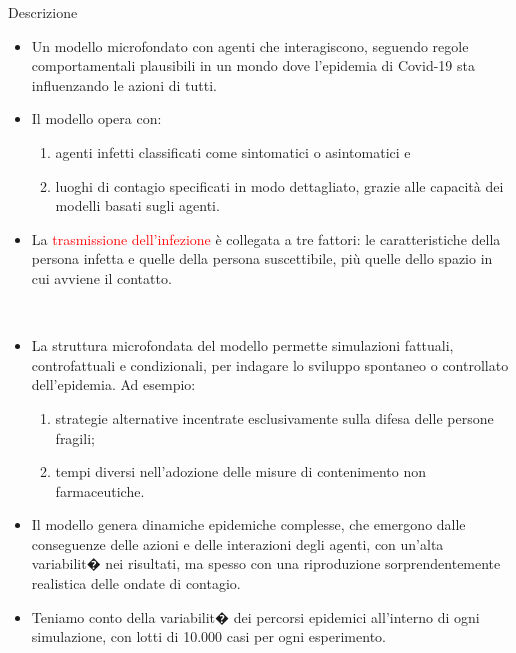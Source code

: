 \documentclass[]{beamer}
\begin{document}
\begin{frame}{Descrizione}

\begin{itemize}

\item
Un modello microfondato con agenti che interagiscono, seguendo regole comportamentali plausibili in un mondo dove l'epidemia di Covid-19 sta influenzando le azioni di tutti.
\item
Il modello opera con:

\begin{enumerate}[i]
\item agenti infetti classificati come sintomatici o asintomatici e
\item luoghi di contagio specificati in modo dettagliato, grazie alle capacit\`{a} dei modelli basati sugli agenti.
\end{enumerate}

 \item La \textcolor{red}{trasmissione dell'infezione} \`{e} collegata a tre fattori: le caratteristiche della persona infetta e quelle della persona suscettibile, pi\`{u} quelle dello spazio in cui avviene il contatto.

\end{itemize}
\end{frame}

\begin{frame}{~}

\begin{itemize}
\item
La struttura microfondata del modello permette simulazioni fattuali, controfattuali e condizionali, per indagare lo sviluppo spontaneo o controllato dell'epidemia. Ad esempio:

\begin{enumerate}[i]
\item  strategie alternative incentrate esclusivamente sulla difesa delle persone fragili;
\item tempi diversi nell'adozione delle misure di contenimento non farmaceutiche.
\end{enumerate}

\item
Il modello genera dinamiche epidemiche complesse, che emergono dalle conseguenze delle azioni e delle interazioni degli agenti, con un'alta variabilit� nei risultati, ma spesso con una riproduzione sorprendentemente realistica delle ondate di contagio.

\item
Teniamo conto della variabilit� dei percorsi epidemici all'interno di ogni simulazione, con lotti di 10.000 casi per ogni esperimento.

\end{itemize}
\end{frame}
\end{document}

